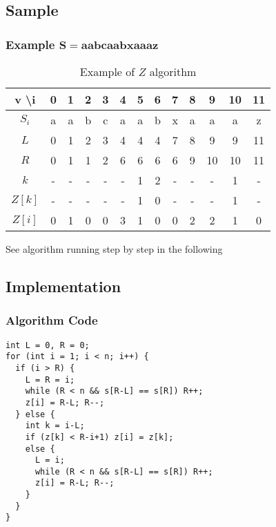 \documentclass{beamer}
\begin{document}
\subsection{Sample}
\begin{frame}
\frametitle{Example $\mathbf{S=aabcaabxaaaz}$}
\begin{table}
\begin{tabular}{| c | c | c | c | c | c | c | c | c | c | c | c | c |}
\toprule
\textbf{v \textbackslash  i } & \textbf{0} & \textbf{1} & \textbf{2} & \textbf{3} & \textbf{4} & \textbf{5} & \textbf{6} & \textbf{7} & \textbf{8}  & \textbf{9} & \textbf{10}  & \textbf{11} \\
\midrule
$S_i$ &a  & a &  b & c  &  a  & a  &  b  &  x  &  a  &  a  &  a  & z  \\ %
\midrule
$ L $      &  0  & 1  & 2  & 3  &  4  & 4  &  4  &  7  &  8  &  9  &  9  & 11  \\
$ R $      &  0  & 1  & 1  & 2  &  6  & 6  &  6  &  6  &  9  & 10 & 10 & 11 \\
$ k $      &  -  &  -  &  -  & -   &  -   & 1  &  2  &  -   &  -  &  -   &  1  &  -  \\
$ Z[ k ] $ &  -  &  -  &  -  & -   &  -   & 1  &  0  &  -  &  -   &  -   &  1  &  -  \\
\midrule
$ Z[ i ] $ &  0 &  1 &  0  & 0  & 3   & 1  &  0  &  0  &  2  &  2  &  1 & 0 \\
\bottomrule
\end{tabular}
\caption{Example of $Z$ algorithm}
\end{table}
See algorithm running step by step in the following \href{http://www.utdallas.edu/~besp/demo/John2010/z-algorithm.htm}{}
\end{frame}

\subsection{Implementation}
\begin{frame}[fragile] %
\frametitle{Algorithm Code}
\begin{example}[ C++ Implementation ]
\begin{lstlisting}
int L = 0, R = 0;
for (int i = 1; i < n; i++) {
  if (i > R) {
    L = R = i;
    while (R < n && s[R-L] == s[R]) R++;
    z[i] = R-L; R--;
  } else {
    int k = i-L;
    if (z[k] < R-i+1) z[i] = z[k];
    else {
      L = i;
      while (R < n && s[R-L] == s[R]) R++;
      z[i] = R-L; R--;
    }
  }
}
\end{lstlisting}
\end{example}
\end{frame}
\end{document}
